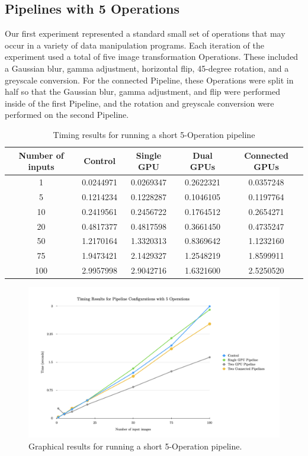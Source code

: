 \subsection{Pipelines with 5 Operations}

Our first experiment represented a standard small set of operations that may occur in a variety of data manipulation programs. Each iteration of the experiment used a total of five image transformation Operations. These included a Gaussian blur, gamma adjustment, horizontal flip, 45-degree rotation, and a greyscale conversion. For the connected Pipeline, these Operations were split in half so that the Gaussian blur, gamma adjustment, and flip were performed inside of the first Pipeline, and the rotation and greyscale conversion were performed on the second Pipeline.

\begin{table}[H]
\centering
\begin{tabular}{ |c|c|c|c|c| } 
\hline
Number of inputs & Control & Single GPU & Dual GPUs & Connected GPUs \\
\hline
1&	0.0244971&	0.0269347&	0.2622321&	0.0357248 \\
5&	0.1214234&	0.1228287&	0.1046105&	0.1197764\\
10&	0.2419561&	0.2456722&	0.1764512&	0.2654271\\
20&	0.4817377&	0.4817598&	0.3661450&	0.4735247\\
50&	1.2170164&	1.3320313&	0.8369642&	1.1232160\\
75&	1.9473421&	2.1429327&	1.2548219&	1.8599911\\
100&	2.9957998&	2.9042716&	1.6321600&	2.5250520\\
\hline
\end{tabular}
\caption{Timing results for running a short 5-Operation pipeline}
\label{pipelineTable1}
\end{table}

\begin{figure}[H]
\includegraphics[width=\textwidth]{figures/pipelineChart1.png}
\centering
\caption{Graphical results for running a short 5-Operation pipeline.}
\label{pipelineChart1}
\end{figure}

